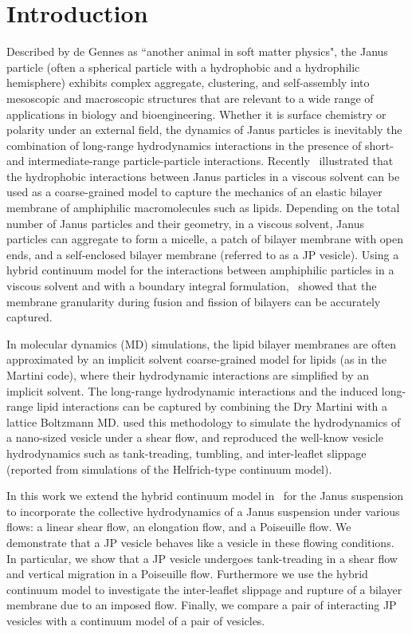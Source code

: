 \documentclass[lineno]{jfm}
\begin{document}
\section{\label{intro}Introduction}
Described by de Gennes as ``another animal in soft matter physics", the
Janus particle (often a spherical particle with a hydrophobic and a
hydrophilic hemisphere) exhibits complex aggregate, clustering, and
self-assembly into mesoscopic and macroscopic structures that are
relevant to a wide range of applications in biology and bioengineering.
Whether it is surface chemistry or polarity under an external field, the
dynamics of Janus particles is inevitably the combination of long-range
hydrodynamics interactions in the presence of short- and
intermediate-range particle-particle interactions. Recently~\cite{Fu20}
illustrated that the hydrophobic interactions between Janus particles in
a viscous solvent can be used as a coarse-grained model to capture the
mechanics of an elastic bilayer membrane of amphiphilic macromolecules
such as lipids. Depending on the total number of Janus particles and
their geometry, in a viscous solvent, Janus particles can aggregate to
form a micelle, a patch of bilayer membrane with open ends, and a
self-enclosed bilayer membrane (referred to as a JP vesicle). Using a
hybrid continuum model for the interactions between amphiphilic
particles in a viscous solvent and with a boundary integral
formulation,~\cite{Fu20} showed that the membrane granularity during
fusion and fission of bilayers can be accurately captured. 

In molecular dynamics (MD) simulations, the lipid bilayer membranes are
often approximated by an implicit solvent coarse-grained model for
lipids (as in the Martini code), where their hydrodynamic interactions
are simplified by an implicit solvent. The long-range hydrodynamic
interactions and the induced long-range lipid interactions can be
captured by combining the Dry Martini with a lattice Boltzmann MD.
\cite{Brandner2019} used this methodology to simulate the hydrodynamics
of a nano-sized vesicle under a shear flow, and reproduced the well-know
vesicle hydrodynamics such as tank-treading, tumbling, and inter-leaflet
slippage (reported from simulations of the Helfrich-type continuum
model).

In this work we extend the hybrid continuum model in~\cite{Fu20} for the
Janus suspension to incorporate the collective hydrodynamics of a Janus
suspension under various flows: a linear shear flow, an elongation flow,
and a Poiseuille flow. We demonstrate that a JP vesicle behaves like
a vesicle in these flowing conditions. In particular, we show that a
JP vesicle undergoes tank-treading in a shear flow and vertical
migration in a Poiseuille flow. Furthermore we use the hybrid continuum
model to investigate the inter-leaflet slippage and rupture of a bilayer
membrane due to an imposed flow. Finally, we compare a pair of
interacting JP vesicles with a continuum model of a pair of vesicles.
\end{document}
